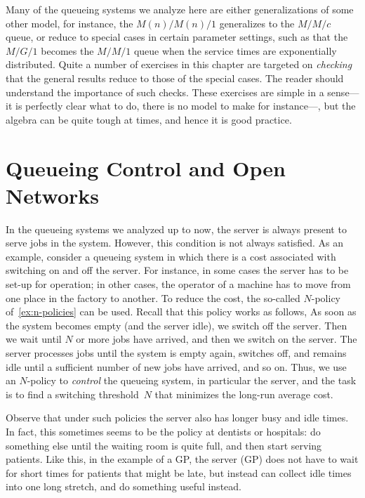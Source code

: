 Many of the queueing systems we analyze here are either generalizations of some other model, for instance, the $M(n)/M(n)/1$ generalizes to the $M/M/c$ queue, or reduce to special cases in certain parameter settings, such as that the $M/G/1$ becomes the $M/M/1$ queue when the service times are exponentially distributed.
Quite a number of exercises in this chapter are targeted on \emph{checking} that the general results reduce to those of the special cases.
The reader should understand the importance of such checks.
These exercises are simple in a sense---it is perfectly clear what to do, there is no model to make for instance---, but the algebra can be quite tough at times, and hence it is good practice.







% 
%


\chapter{Queueing Control and Open Networks}
\label{cha:queu-contr-open}

In the queueing systems we analyzed up to now, the server is always present to serve jobs in the system. However, this condition is not always satisfied.
As an example, consider a queueing system in which there is a cost associated with switching on and off the server.
For instance, in some cases the server has to be set-up for operation; in other cases, the operator of a machine has to move from one place in the factory to another.
To reduce the cost, the  so-called $N$-policy of~\cref{ex:n-policies} can be used. Recall that this policy works as follows, 
As soon as the system becomes empty (and the server idle), we switch off the server.
Then we wait until $N$ or more jobs have arrived, and then we switch on the server.
The server processes jobs until the system is empty again, switches off, and remains idle until a sufficient number of new jobs have arrived,  and so on.
Thus, we use an $N$-policy to \emph{control} the queueing system, in particular the server, and the task is to find a switching threshold~$N$ that minimizes the long-run average cost.

Observe that under such policies the server also has longer busy and idle times.
In fact, this sometimes seems to be the policy at dentists or hospitals: do something else until the waiting room is quite full, and then start serving patients.
Like this, in the example of a GP, the server (GP) does not have to wait for short times for patients that might be late, but instead can collect idle times into one long stretch, and do something useful instead.

